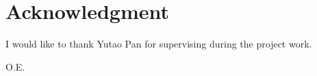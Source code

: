 \section*{Acknowledgment}
I would like to thank Yutao Pan for supervising during the project work.


\begin{flushright}
O.E.\\[1pc]
\end{flushright}
